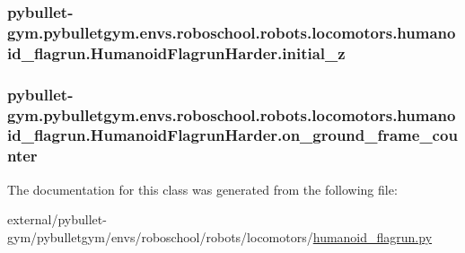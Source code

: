 \subsubsection[{\texorpdfstring{initial\+\_\+z}{initial_z}}]{\setlength{\rightskip}{0pt plus 5cm}pybullet-\/gym.\+pybulletgym.\+envs.\+roboschool.\+robots.\+locomotors.\+humanoid\+\_\+flagrun.\+Humanoid\+Flagrun\+Harder.\+initial\+\_\+z}\hypertarget{classpybullet-gym_1_1pybulletgym_1_1envs_1_1roboschool_1_1robots_1_1locomotors_1_1humanoid__flagrun_1_1_humanoid_flagrun_harder_ad4eed86a2657bb9053cae2adcf497d6c}{}\label{classpybullet-gym_1_1pybulletgym_1_1envs_1_1roboschool_1_1robots_1_1locomotors_1_1humanoid__flagrun_1_1_humanoid_flagrun_harder_ad4eed86a2657bb9053cae2adcf497d6c}
\subsubsection[{\texorpdfstring{on\+\_\+ground\+\_\+frame\+\_\+counter}{on_ground_frame_counter}}]{\setlength{\rightskip}{0pt plus 5cm}pybullet-\/gym.\+pybulletgym.\+envs.\+roboschool.\+robots.\+locomotors.\+humanoid\+\_\+flagrun.\+Humanoid\+Flagrun\+Harder.\+on\+\_\+ground\+\_\+frame\+\_\+counter}\hypertarget{classpybullet-gym_1_1pybulletgym_1_1envs_1_1roboschool_1_1robots_1_1locomotors_1_1humanoid__flagrun_1_1_humanoid_flagrun_harder_a3319b58eeb6aa0b06efe565afbe52d34}{}\label{classpybullet-gym_1_1pybulletgym_1_1envs_1_1roboschool_1_1robots_1_1locomotors_1_1humanoid__flagrun_1_1_humanoid_flagrun_harder_a3319b58eeb6aa0b06efe565afbe52d34}


The documentation for this class was generated from the following file\+:\begin{DoxyCompactItemize}
\item 
external/pybullet-\/gym/pybulletgym/envs/roboschool/robots/locomotors/\hyperlink{humanoid__flagrun_8py}{humanoid\+\_\+flagrun.\+py}\end{DoxyCompactItemize}
